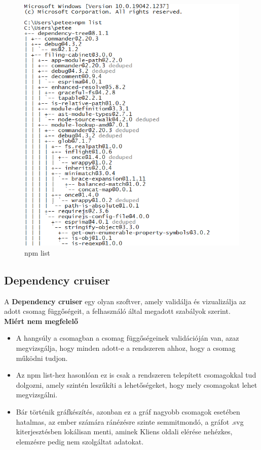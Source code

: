 	\begin{flushright}
		\cite{dep-cruise}
	\end{flushright}
	
	\begin{figure}[h]
		\centering
		\includegraphics[scale=0.35]{images/npm_ls.png}
		\caption{npm list}
		\label{fig:npm-ls}
	\end{figure}
	
	\subsection{Dependency cruiser}
	
	A \textbf{Dependency cruiser} egy olyan szoftver, amely validálja és vizualizálja az adott csomag függőségeit, a felhasználó által megadott szabályok szerint.\\
	
	\textbf{Miért nem megfelelő}
	\begin{itemize}
		\item A hangsúly a csomagban a csomag függőségeinek validációján van, azaz megvizsgálja, hogy minden adott-e a rendszeren ahhoz, hogy a csomag működni tudjon.
		\item Az npm list-hez hasonlóan ez is csak a rendszeren telepített csomagokkal tud dolgozni, amely szintén leszűkíti a lehetőségeket, hogy mely csomagokat lehet megvizsgálni.
		\item Bár történik gráfkészítés, azonban ez a gráf nagyobb csomagok esetében hatalmas, az ember számára ránézésre szinte semmitmondó, a gráfot .svg kiterjesztésben lokálisan menti, aminek Kliens oldali elérése nehézkes, elemzésre pedig nem szolgáltat adatokat.
	\end{itemize}
	
